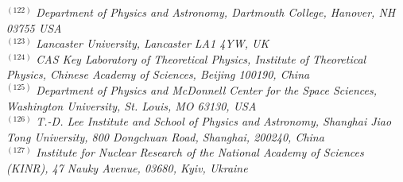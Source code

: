 {\begin{center}
$^{(122)}$ \emph{Department of Physics and Astronomy, Dartmouth College, Hanover, NH 03755 USA}\\
$^{(123)}$ \emph{Lancaster University, Lancaster LA1 4YW, UK}\\
$^{(124)}$ \emph{CAS Key Laboratory of Theoretical Physics, Institute of Theoretical Physics, Chinese Academy of Sciences, Beijing 100190, China}\\
$^{(125)}$ \emph{Department of Physics and McDonnell Center for the Space Sciences, Washington University, St. Louis, MO 63130, USA}\\
$^{(126)}$ \emph{T.-D. Lee Institute and School of Physics and Astronomy, Shanghai Jiao Tong University, 800 Dongchuan Road, Shanghai, 200240, China}\\
$^{(127)}$ \emph{Institute for Nuclear Research of the National Academy of Sciences (KINR), 47 Nauky Avenue, 03680, Kyiv, Ukraine}\\

\end{center}}
